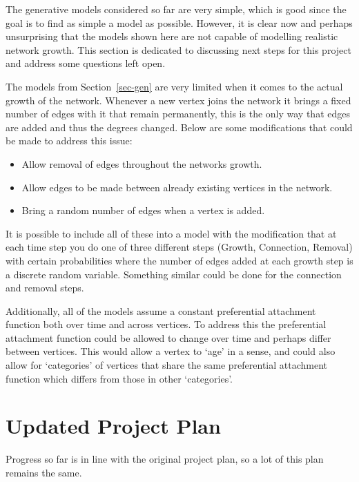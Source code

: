 \documentclass[
  10pt,
  a4paper,
]{scrreprt}
\providecommand{\tightlist}{%
  \setlength{\itemsep}{0pt}\setlength{\parskip}{0pt}}\usepackage{longtable,booktabs,array}
\theoremstyle{plain}
\theoremstyle{definition}
\theoremstyle{plain}
\theoremstyle{remark}
\begin{document}
{The generative models considered so far are very simple, which is good
since the goal is to find as simple a model as possible. However, it is
clear now and perhaps unsurprising that the models shown here are not
capable of modelling realistic network growth. This section is dedicated
to discussing next steps for this project and address some questions
left open.

The models from Section~\ref{sec-gen} are very limited when it comes to
the actual growth of the network. Whenever a new vertex joins the
network it brings a fixed number of edges with it that remain
permanently, this is the only way that edges are added and thus the
degrees changed. Below are some modifications that could be made to
address this issue:

\begin{itemize}
\tightlist
\item
  Allow removal of edges throughout the networks growth.
\item
  Allow edges to be made between already existing vertices in the
  network.
\item
  Bring a random number of edges when a vertex is added.
\end{itemize}

It is possible to include all of these into a model with the
modification that at each time step you do one of three different steps
(Growth, Connection, Removal) with certain probabilities where the
number of edges added at each growth step is a discrete random variable.
Something similar could be done for the connection and removal steps.

Additionally, all of the models assume a constant preferential
attachment function both over time and across vertices. To address this
the preferential attachment function could be allowed to change over
time and perhaps differ between vertices. This would allow a vertex to
`age' in a sense, and could also allow for `categories' of vertices that
share the same preferential attachment function which differs from those
in other `categories'.

\appendix

\hypertarget{sec-plan}{%
\chapter{Updated Project Plan}\label{sec-plan}}

Progress so far is in line with the original project plan, so a lot of
this plan remains the same.

}
\end{document}
